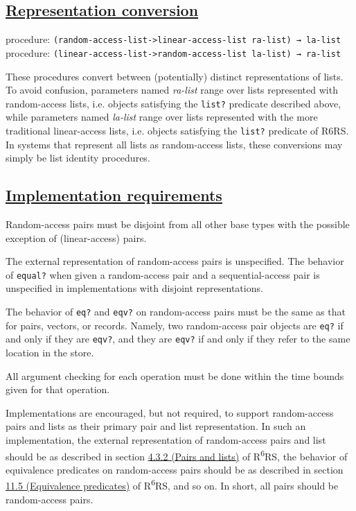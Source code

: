 \subsection{\texorpdfstring{\href{}{Representation
conversion}}{Representation conversion}}\label{representation-conversion}

procedure:
\texttt{(random-access-list-\textgreater{}linear-access-list\ ra-list)\ →\ la-list}\\
procedure:
\texttt{(linear-access-list-\textgreater{}random-access-list\ la-list)\ →\ ra-list}

These procedures convert between (potentially) distinct representations
of lists. To avoid confusion, parameters named \emph{ra-list} range over
lists represented with random-access lists, i.e. objects satisfying the
\texttt{list?} predicate described above, while parameters named
\emph{la-list} range over lists represented with the more traditional
linear-access lists, i.e. objects satisfying the \texttt{list?}
predicate of R6RS. In systems that represent all lists as random-access
lists, these conversions may simply be list identity procedures.

\subsection{\texorpdfstring{\href{}{Implementation
requirements}}{Implementation requirements}}\label{implementation-requirements}

Random-access pairs must be disjoint from all other base types with the
possible exception of (linear-access) pairs.

The external representation of random-access pairs is unspecified. The
behavior of \texttt{equal?} when given a random-access pair and a
sequential-access pair is unspecified in implementations with disjoint
representations.

The behavior of \texttt{eq?} and \texttt{eqv?} on random-access pairs
must be the same as that for pairs, vectors, or records. Namely, two
random-access pair objects are \texttt{eq?} if and only if they are
\texttt{eqv?}, and they are \texttt{eqv?} if and only if they refer to
the same location in the store.

All argument checking for each operation must be done within the time
bounds given for that operation.

Implementations are encouraged, but not required, to support
random-access pairs and lists as their primary pair and list
representation. In such an implementation, the external representation
of random-access pairs and list should be as described in section
\href{http://www.r6rs.org/final/html/r6rs/r6rs-Z-H-7.html\#node_sec_4.3.2}{4.3.2
(Pairs and lists)} of R\textsuperscript{6}RS, the behavior of
equivalence predicates on random-access pairs should be as described in
section
\href{http://www.r6rs.org/final/html/r6rs/r6rs-Z-H-14.html\#node_idx_436}{11.5
(Equivalence predicates)} of R\textsuperscript{6}RS, and so on. In
short, all pairs should be random-access pairs.

